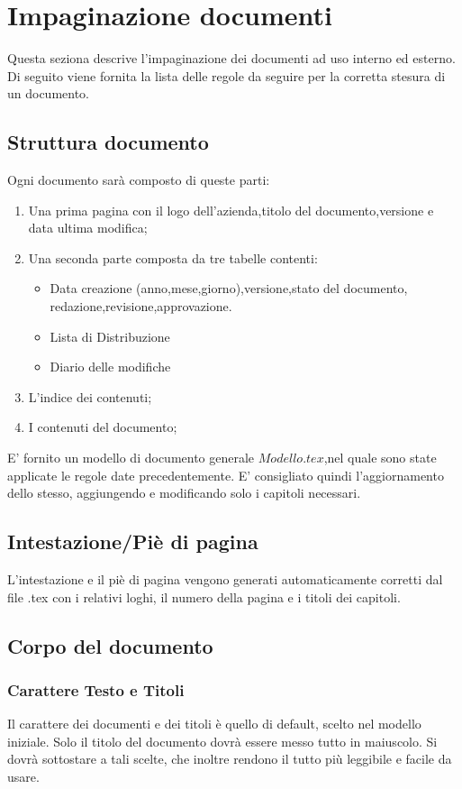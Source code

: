 \documentclass[11pt,titlepage,a4paper]{report}
\begin{document}
\section{Impaginazione documenti}
Questa seziona descrive l'impaginazione dei documenti ad uso interno ed esterno. Di seguito viene fornita la lista delle regole da seguire per la corretta stesura di un documento.
\subsection{Struttura documento}
Ogni documento sar\`a composto di queste parti:
\begin{enumerate}
\item Una prima pagina con il logo dell'azienda,titolo del documento,versione e data ultima modifica;
\item Una seconda parte composta da tre tabelle contenti:
	{\begin{itemize}
	\item Data creazione (anno,mese,giorno),versione,stato del documento,\\
			redazione,revisione,approvazione.
	\item Lista di Distribuzione
	\item Diario delle modifiche 
	\end{itemize}}
\item L'indice dei contenuti;
\item I contenuti del documento;
\end{enumerate}
E' fornito un modello di documento generale \( Modello.tex\),nel quale sono state applicate le regole date precedentemente. E' consigliato quindi l'aggiornamento dello stesso, aggiungendo e modificando solo i capitoli necessari.
\subsection{Intestazione/Pi\`e di pagina}
L'intestazione e il pi\`e di pagina vengono generati automaticamente corretti dal file .tex con i relativi loghi, il numero della pagina e i titoli dei capitoli.
\subsection{Corpo del documento}
\subsubsection{Carattere Testo e Titoli}
Il carattere dei documenti e dei titoli \`e quello di default, scelto nel modello iniziale. Solo il titolo del documento dovr\`a essere messo tutto in maiuscolo. Si dovr\`a sottostare a tali scelte, che inoltre rendono il tutto pi\`u leggibile e facile da usare. 
\end{document}
